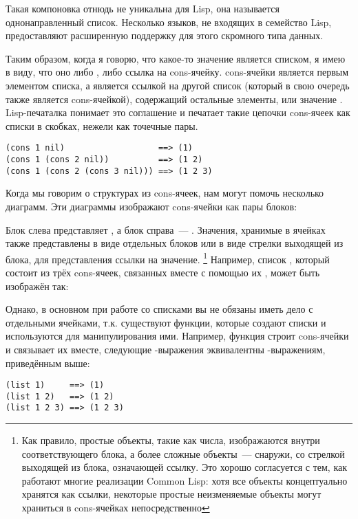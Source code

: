 Такая компоновка отнюдь не уникальна для Lisp, она называется однонаправленный
список. Несколько языков, не входящих в семейство Lisp, предоставляют расширенную
поддержку для этого скромного типа данных.

Таким образом, когда я говорю, что какое-то значение является списком, я имею в виду, что
оно либо , либо ссылка на cons-ячейку.  cons-ячейки является первым
элементом списка, а  является ссылкой на другой список (который в свою очередь
также является cons-ячейкой), содержащий остальные элементы, или значение
. Lisp-печаталка понимает это соглашение и печатает такие цепочки cons-ячеек как
списки в скобках, нежели как точечные пары.

\begin{lstlisting}
(cons 1 nil)                   ==> (1)
(cons 1 (cons 2 nil))          ==> (1 2)
(cons 1 (cons 2 (cons 3 nil))) ==> (1 2 3)
\end{lstlisting}

Когда мы говорим о структурах из cons-ячеек, нам могут помочь несколько диаграмм. Эти
диаграммы изображают cons-ячейки как пары блоков:


Блок слева представляет , а блок справа~--- . Значения, хранимые в
ячейках также представлены в виде отдельных блоков или в виде стрелки выходящей из блока,
для представления ссылки на значение. \footnote{Как правило, простые объекты, такие как
  числа, изображаются внутри соответствующего блока, а более сложные объекты~--- снаружи, со
  стрелкой выходящей из блока, означающей ссылку. Это хорошо согласуется с тем, как
  работают многие реализации Common Lisp: хотя все объекты концептуально хранятся как
  ссылки, некоторые простые неизменяемые объекты могут храниться в cons-ячейках
  непосредственно} Например, список , который состоит из трёх cons-ячеек,
связанных вместе с помощью их , может быть изображён так:


Однако, в основном при работе со списками вы не обязаны иметь дело с отдельными ячейками,
т.к. существуют функции, которые создают списки и используются для манипулирования
ими. Например, функция  строит cons-ячейки и связывает их вместе, следующие
-выражения эквивалентны -выражениям, приведённым выше:

\begin{lstlisting}
(list 1)     ==> (1)
(list 1 2)   ==> (1 2)
(list 1 2 3) ==> (1 2 3)
\end{lstlisting}

